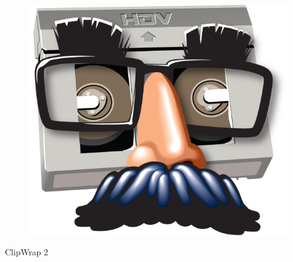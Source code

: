 
\thispagestyle{empty} %



\begin{figure}[H]
\hspace{0.5cm}
\includegraphics[scale = 0.4,left]{images/Clipwrap-icon-large.png}
\end{figure}


	\parbox[t]{1.0\linewidth}{
		\fontsize{60pt}{10pt}\selectfont %
		\vspace*{-0.7cm} %
		{\setmainfont{Whitney Semibold}\selectfont
		ClipWrap 2}
		
		\vspace*{0.5cm} %
	}



\vfill %


